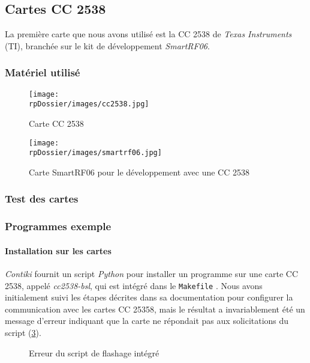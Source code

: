 \subsection{Cartes CC 2538}

La première carte que nous avons utilisé est la CC 2538 de \emph{Texas Instruments} (TI), branchée sur le kit de développement \emph{SmartRF06}.

\subsubsection{Matériel utilisé}

\begin{figure}[H]
\centering
\texttt{[image: \\rpDossier/images/cc2538.jpg]}
\caption{Carte CC 2538}
\label{cc2538}
\end{figure}

\begin{figure}[H]
\centering
\texttt{[image: \\rpDossier/images/smartrf06.jpg]}
\caption{Carte SmartRF06 pour le développement avec une CC 2538}
\label{smartrf06}
\end{figure}
\todo[descriptions]

\subsubsection{Test des cartes}


\subsubsection{Programmes exemple}

\paragraph{Installation sur les cartes}

\emph{Contiki} fournit un script \emph{Python} pour installer un programme sur une carte CC 2538, appelé \emph{cc2538-bsl}, qui est intégré dans le \texttt{Makefile} .
Nous avons initialement suivi les étapes décrites dans sa documentation pour configurer la communication avec les cartes CC 25358, mais le résultat a invariablement été un message d’erreur indiquant que la carte ne répondait pas aux solicitations du script (\cref{bsl-error}).

\begin{figure}[H]
\centering
{}
\caption{Erreur du script de flashage intégré}
\label{bsl-error}
\end{figure}

